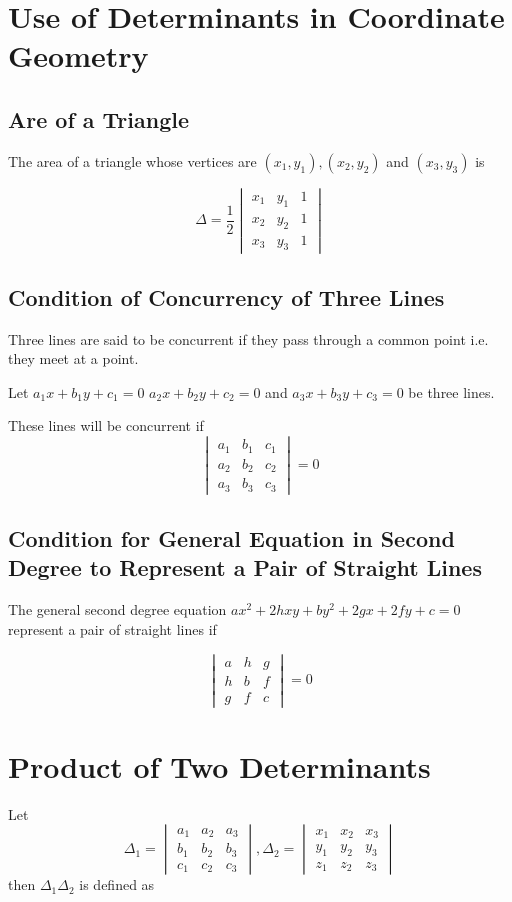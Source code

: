 \section{Use of Determinants in Coordinate Geometry}

\subsection{Are of a Triangle}
The area of a triangle whose vertices are $(x_1, y_1), (x_2, y_2)$ and $(x_3, y_3)$ is

$$\Delta = \frac{1}{2}\begin{vmatrix}x_1 & y_1 & 1\\x_2 & y_2 & 1\\x_3 & y_3 &1\end{vmatrix}$$

\subsection{Condition of Concurrency of Three Lines}
Three lines are said to be concurrent if they pass through a common point i.e. they meet at a point.

Let $a_1x + b_1y + c_1 = 0$ $a_2x + b_2y + c_2 = 0$ and $a_3x+ b_3y + c_3 = 0$ be three lines.

These lines will be concurrent if
$$\begin{vmatrix}a_1&b_1&c_1\\a_2&b_2&c_2\\a_3&b_3&c_3\end{vmatrix} = 0$$

\subsection{Condition for General Equation in Second Degree to Represent a Pair of Straight Lines}
The general second degree equation $ax^2 + 2hxy + by^2 + 2gx + 2fy + c = 0$ represent a pair of straight lines if

$$\begin{vmatrix}a & h & g\\h & b & f\\g & f & c\end{vmatrix} = 0$$

\section{Product of Two Determinants}
Let $$\Delta_1 = \begin{vmatrix}a_1 & a_2 & a_3\\b_1 & b_2 & b_3\\c_1 &
c_2 & c_3\end{vmatrix}, \Delta_2 = \begin{vmatrix}x_1 & x_2 &
x_3\\y_1 & y_2 & y_3\\z_1 & z_2 & z_3\end{vmatrix}$$ then
$\Delta_1\Delta_2$ is defined as

